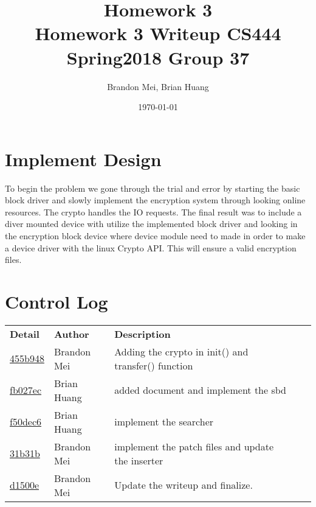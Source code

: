 \documentclass[onecolumn, draftclsnofoot, 10pt, titlepage, compsoc]{IEEEtran}
\title
{%
	Homework 3 \\
	\vspace{0.4cm}
	\large Homework 3 Writeup
	\vspace{0.4cm}
	\large CS444 Spring2018 Group 37
}
\author{Brandon Mei, Brian Huang}
\date{\today}
\begin{document}
\maketitle

\newpage

\section{Implement Design}
To begin the problem we gone through the trial and error by starting the basic block driver and slowly implement the encryption system through looking online resources. The crypto handles the IO requests. The final result was to include a diver mounted device with utilize the implemented block driver and looking in the encryption block device where device module need to made in order to make a device driver with the linux Crypto API. This will ensure a valid encryption files.\\

\section{Control Log}

\begin{tabular}{l p{5cm} l p{5cm} l}
\textbf{Detail} & \textbf{Author} & \textbf{Description}\\
\href{https://github.com/BrandonMei/Operating-Systems-II/commit/455b948f6fa4bd664c303a0e7ca383fb4e0bc508}{455b948} & Brandon Mei & Adding the crypto in init() and transfer() function\\\hline
\href{https://github.com/BrandonMei/Operating-Systems-II/commit/fb027eca580c363ed2c2800114e7b14c9805f1e1}{fb027ec} & Brian Huang & added document and implement the sbd\\\hline
\href{https://github.com/BrandonMei/Operating-Systems-II/commit/f50dec643a641515fb1834436ac0b255e7116ebe}{f50dec6} & Brian Huang & implement the searcher\\\hline
\href{https://github.com/BrandonMei/Operating-Systems-II/commit/31b31b0543424d9f951b3f2afda631f730b13e21}{31b31b} & Brandon Mei & implement the patch files and update the inserter\\\hline
\href{https://github.com/BrandonMei/Operating-Systems-II/commit/d1500e9a2595682c1de2afaffdce6e25423dbe74}{d1500e} & Brandon Mei & Update the writeup and finalize.\\\hline

\end{tabular}
\end{document}
